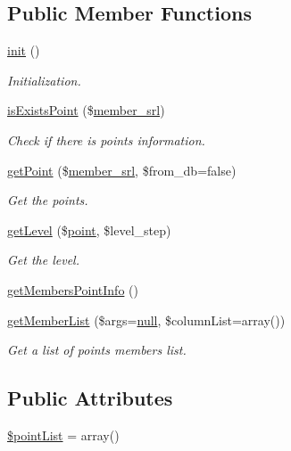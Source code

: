 \subsection*{Public Member Functions}
\begin{DoxyCompactItemize}
\item 
\hyperlink{classpointModel_add66679251115fa4592f15398f3efc62}{init} ()
\begin{DoxyCompactList}\small\item\em Initialization. \end{DoxyCompactList}\item 
\hyperlink{classpointModel_a9e143b8c0eb599eebcce662a70a1dbd9}{is\+Exists\+Point} (\$\hyperlink{ko_8install_8php_aa61f9e08f0fe505094d26f8143f30bbd}{member\+\_\+srl})
\begin{DoxyCompactList}\small\item\em Check if there is points information. \end{DoxyCompactList}\item 
\hyperlink{classpointModel_ac3d92531cca94dd31fde8f6b86a855fc}{get\+Point} (\$\hyperlink{ko_8install_8php_aa61f9e08f0fe505094d26f8143f30bbd}{member\+\_\+srl}, \$from\+\_\+db=false)
\begin{DoxyCompactList}\small\item\em Get the points. \end{DoxyCompactList}\item 
\hyperlink{classpointModel_aaada8e8cba6e965f06c2b25e4974537c}{get\+Level} (\$\hyperlink{classpoint}{point}, \$level\+\_\+step)
\begin{DoxyCompactList}\small\item\em Get the level. \end{DoxyCompactList}\item 
\hyperlink{classpointModel_a87117e204a484410442a54ee56332836}{get\+Members\+Point\+Info} ()
\item 
\hyperlink{classpointModel_ab3b968a740e10f9039da99adae67dcb7}{get\+Member\+List} (\$args=\hyperlink{modernizr_8min_8js_a286f9ec831c5e676eeb493248eab9575}{null}, \$column\+List=array())
\begin{DoxyCompactList}\small\item\em Get a list of points members list. \end{DoxyCompactList}\end{DoxyCompactItemize}
\subsection*{Public Attributes}
\begin{DoxyCompactItemize}
\item 
\hyperlink{classpointModel_a4aec7fcf0df721c0046d2b9a9380f0ae}{\$point\+List} = array()
\end{DoxyCompactItemize}


